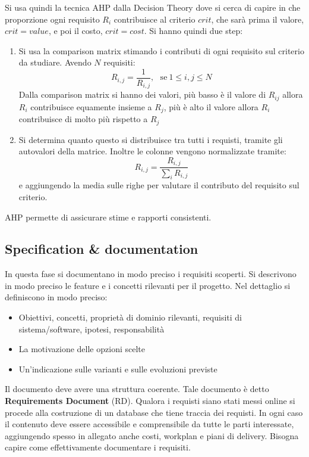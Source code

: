 Si usa quindi la tecnica AHP dalla Decision Theory dove si cerca di capire in che
proporzione ogni requisito $R_i$ contribuisce al criterio $crit$, che sarà prima
il valore, $crit = value$, e poi il costo, $crit = cost$. Si hanno quindi due step:
\begin{enumerate}
      \item Si usa la comparison matrix stimando i contributi di ogni requisito sul
            criterio da studiare. Avendo $N$ requisiti:
            \begin{equation}
                  R_{i, j} = \frac{1}{R_{i, j}}, \ \ \ \text{se} \ 1 \leq i, j\leq N
            \end{equation}
            Dalla comparison matrix si hanno dei valori, più basso è il valore di $R_{ij}$
            allora $R_i$ contribuisce equamente insieme a $R_j$, più è alto il valore allora
            $R_i$ contribuisce  di molto più rispetto a $R_j$
      \item Si determina quanto questo si distribuisce tra tutti i requisti, tramite
            gli autovalori della matrice. Inoltre le colonne vengono normalizzate tramite:
            \begin{equation}
                  R_{i, j} = \frac{R_{i, j}}{\sum_i R_{i, j}}
            \end{equation}
            e aggiungendo la media sulle righe per valutare il contributo del requisito
            sul criterio.
\end{enumerate}
AHP permette di assicurare stime e rapporti consistenti.

\subsection{Specification \& documentation}
In questa fase si documentano in modo preciso i requisiti scoperti. Si descrivono
in modo preciso le feature e i concetti rilevanti per il progetto. Nel dettaglio
si definiscono in modo preciso:
\begin{itemize}
      \item Obiettivi, concetti, proprietà di dominio rilevanti, requisiti di
            sistema/software, ipotesi, responsabilità
      \item La motivazione delle opzioni scelte
      \item Un'indicazione sulle varianti e sulle evoluzioni previste
\end{itemize}

Il documento deve avere una struttura coerente. Tale documento è detto
\textbf{Requirements Document} (RD). Qualora i requisti siano stati messi online
si procede alla costruzione di un database che tiene traccia dei requisti. In ogni
caso il contenuto deve essere accessibile e comprensibile da tutte le parti
interessate, aggiungendo spesso in allegato anche costi, workplan e piani di delivery.
Bisogna capire come effettivamente documentare i requisiti.

